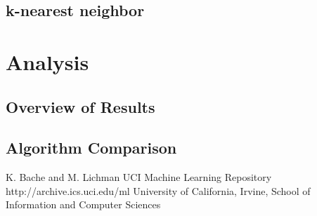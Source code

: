 \documentclass{acm_proc_article-sp}
\begin{document}
\subsection{k-nearest neighbor}


\section{Analysis}

\subsection{Overview of Results}

\subsection{Algorithm Comparison}





\begin{thebibliography}{10}

K. Bache and M. Lichman
\newblock UCI Machine Learning Repository
\newblock http://archive.ics.uci.edu/ml
\newblock University of California, Irvine, School of Information and Computer Sciences


\end{thebibliography}
\end{document}
